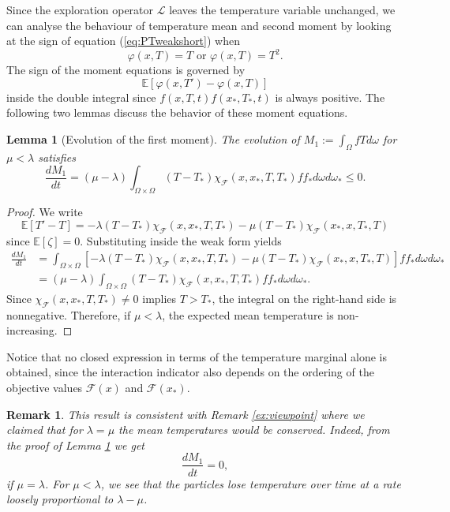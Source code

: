 \documentclass[10pt,a4paper]{article}
\theoremstyle{theorem}
\newtheorem{remark}{Remark}[section]
\newtheorem{lemma}{Lemma}[section]
\numberwithin{equation}{section}
\begin{document}
Since the exploration operator $\mathcal L$ leaves the temperature variable unchanged, we can analyse the behaviour of temperature mean and second moment by looking at the sign of equation (\ref{eq:PTweakshort}) when 
\begin{equation}
\varphi(x,T) = T \text{ or } \varphi(x,T) = T^2.
\end{equation}
The sign of the moment equations is governed by 
\begin{equation*}
\mathbb{E}\left[\varphi(x,T')-\varphi(x,T)\right]
\end{equation*}
inside the double integral since $f(x,T,t)f(x_*,T_*,t)$ is always positive. The following two lemmas discuss the behavior of these moment equations.

\begin{lemma}[Evolution of the first moment]
\label{lemma:moment1}
The evolution of $M_1:=\int_{\Omega}fTd\omega$ for $\mu<\lambda$ satisfies
\begin{equation*}
\frac{dM_1}{dt} = (\mu-\lambda)\int_{\Omega\times\Omega}(T-T_*)\chi_\mathcal{F}(x,x_*,T,T_*){ff_*}d\omega d\omega_* \leq 0.
\end{equation*}
\end{lemma}
\begin{proof}
We write
\begin{equation*}
\mathbb{E}\left[ T'-T\right] =  -\lambda(T-T_*)\chi_\mathcal{F}(x,x_*,T,T_*)-\mu(T-T_*)\chi_\mathcal{F}(x_*,x,T_*,T)
\end{equation*}
since $\mathbb{E}\left[\zeta\right] = 0$. Substituting inside the weak form yields
\begin{align*}
\frac{dM_1}{dt} &=\int_{\Omega\times\Omega}\left[-\lambda(T-T_*)\chi_\mathcal{F}(x,x_*,T,T_*)-\mu(T-T_*)\chi_\mathcal{F}(x_*,x,T_*,T)\right]ff_*d\omega d\omega_*\\
&=(\mu-\lambda)\int_{\Omega\times\Omega}(T-T_*)\chi_\mathcal{F}(x,x_*,T,T_*){ff_*}d\omega d\omega_*.
\end{align*}
Since \(\chi_\mathcal{F}(x,x_*,T,T_*)\neq0\) implies \(T>T_*\), the integral on
the right-hand side is nonnegative. Therefore, if \(\mu<\lambda\), the expected
mean temperature is non-increasing. 
\end{proof}
Notice that no closed expression in terms of
the temperature marginal alone is obtained, since the interaction indicator also
depends on the ordering of the objective values \(\mathcal F(x)\) and
\(\mathcal F(x_*)\).
\begin{remark}
\label{rem:speed} This result is consistent with Remark \ref{ex:viewpoint} where we claimed that for $\lambda=\mu$ the mean temperatures would be conserved. Indeed, from the proof of Lemma \ref{lemma:moment1} we get
\begin{equation*}
\frac{dM_1}{dt}=0,
\end{equation*}
if $\mu=\lambda$. For $\mu<\lambda$, we see that the particles lose temperature over time at a rate loosely proportional to $\lambda-\mu$.
\end{remark}
\end{document}
